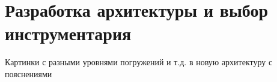 \section{Разработка архитектуры и выбор инструментария}
\label{sec:lit-rev}

Картинки с разными уровнями погружений и т.д. в новую архитектуру с пояснениями

